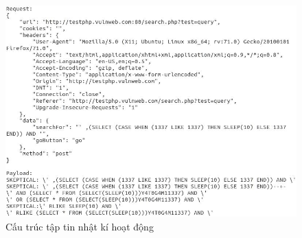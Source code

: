 \begin{figure}[H]
  \centering
    \includegraphics[width=\textwidth,keepaspectratio=true]{images/log-format.jpg}
  \caption{Cấu trúc tập tin nhật kí hoạt động}
  \label{fig:log-format}
\end{figure}
